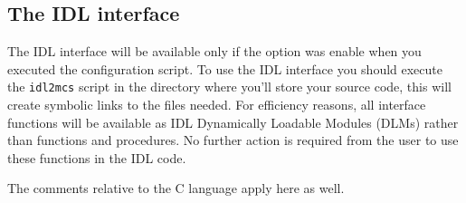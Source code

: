 \documentclass[12pt,titlepage]{article}
\begin{document}
\subsection{The IDL interface}
\label{sec-The IDL interface}
The IDL interface will be available only if the option was enable when
you executed the configuration script. To use the IDL interface you
should execute the \verb|idl2mcs| script in the directory where you'll
store your source code, this will create symbolic links to the
files needed. For efficiency reasons, all interface functions will be
available as IDL Dynamically Loadable Modules (DLMs) rather than
functions and procedures. No further action is required from the user
to use these functions in the IDL code.
%

\noindent The comments relative to the C language apply here as
well.
\end{document}
